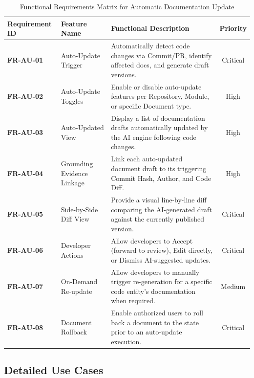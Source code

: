\begin{table}[h!]
\centering
\small
\caption{Functional Requirements Matrix for Automatic Documentation Update}
\vspace{0.5em}
\begin{tabularx}{\textwidth}{|l|p{3.8cm}|X|c|}
\hline
\textbf{Requirement ID} & \textbf{Feature Name} & \textbf{Functional Description} & \textbf{Priority} \\ \hline
\textbf{FR-AU-01} & Auto-Update Trigger & Automatically detect code changes via Commit/PR, identify affected docs, and generate draft versions. & Critical \\ \hline
\textbf{FR-AU-02} & Auto-Update Toggles & Enable or disable auto-update features per Repository, Module, or specific Document type. & High \\ \hline
\textbf{FR-AU-03} & Auto-Updated View & Display a list of documentation drafts automatically updated by the AI engine following code changes. & High \\ \hline
\textbf{FR-AU-04} & Grounding Evidence Linkage & Link each auto-updated document draft to its triggering Commit Hash, Author, and Code Diff. & High \\ \hline
\textbf{FR-AU-05} & Side-by-Side Diff View & Provide a visual line-by-line diff comparing the AI-generated draft against the currently published version. & Critical \\ \hline
\textbf{FR-AU-06} & Developer Actions & Allow developers to Accept (forward to review), Edit directly, or Dismiss AI-suggested updates. & Critical \\ \hline
\textbf{FR-AU-07} & On-Demand Re-update & Allow developers to manually trigger re-generation for a specific code entity's documentation when required. & Medium \\ \hline
\textbf{FR-AU-08} & Document Rollback & Enable authorized users to roll back a document to the state prior to an auto-update execution. & Critical \\ \hline
\end{tabularx}
\end{table}

\subsection{Detailed Use Cases}

